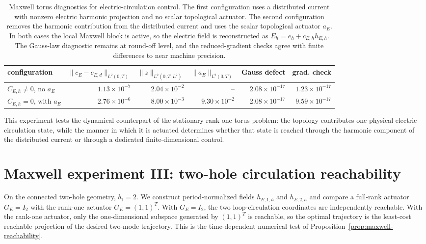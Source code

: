 \documentclass{article}
\begin{document}
\begin{table}[htbp]
\centering
\small
\begin{tabular}{lrrrrr}
\toprule
configuration
& $\|c_E-c_{E,d}\|_{L^2(0,T)}$
& $\|z\|_{L^2(0,T;L^2)}$
& $\|a_E\|_{L^2(0,T)}$
& Gauss defect
& grad. check\\
\midrule
$C_{E,h}\neq0$, no $a_E$
& $1.13\times10^{-7}$
& $2.04\times10^{-2}$
& --
& $2.08\times10^{-17}$
& $1.23\times10^{-17}$\\
$C_{E,h}=0$, with $a_E$
& $2.76\times10^{-6}$
& $8.00\times10^{-3}$
& $9.30\times10^{-2}$
& $2.08\times10^{-17}$
& $9.59\times10^{-17}$\\
\bottomrule
\end{tabular}
\caption{Maxwell torus diagnostics for electric-circulation control.
The first configuration uses a distributed current with nonzero
electric harmonic projection and no scalar topological actuator.  The
second configuration removes the harmonic contribution from the
distributed current and uses the scalar topological actuator \(a_E\).
In both cases the local Maxwell block is active, so the electric field
is reconstructed as \(E_h=e_h+c_{E,h}h_{E,h}\).  The Gauss-law
diagnostic remains at round-off level, and the reduced-gradient checks
agree with finite differences to near machine precision.}
\label{tab:maxwell-torus-results}
\end{table}
This experiment tests the dynamical counterpart of the stationary rank-one torus problem: the topology contributes one physical electric-circulation state, while the manner in which it is actuated determines whether that state is reached through the harmonic component of the distributed current or through a dedicated finite-dimensional control.

\section{Maxwell experiment III: two-hole circulation reachability}
\label{sec:maxwell-fig8-numerics}

On the connected two-hole geometry, \(b_1=2\).  We construct
period-normalized fields \(h_{E,1,h}\) and \(h_{E,2,h}\) and compare a
full-rank actuator \(G_E=I_2\) with the rank-one actuator
\(G_E=(1,1)^T\).  With \(G_E=I_2\), the two loop-circulation coordinates are
independently reachable.  With the rank-one actuator, only the one-dimensional
subspace generated by \((1,1)^T\) is reachable, so the optimal trajectory is
the least-cost reachable projection of the desired two-mode trajectory.  This
is the time-dependent numerical test of Proposition~\ref{prop:maxwell-reachability}.
\end{document}
